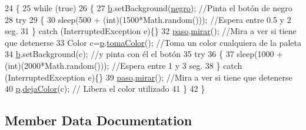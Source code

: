 \begin{DoxyCode}
24     \{
25         \textcolor{keywordflow}{while} (\textcolor{keyword}{true})
26         \{
27             \mbox{\hyperlink{class_r_m_i_1_1_pintor_a00126f610dce8cd5c3fcf4ea2309515a}{b}}.setBackground(\mbox{\hyperlink{class_r_m_i_1_1_pintor_aa79e4aaa47549a4e3903f94e34b9fe6b}{negro}});             \textcolor{comment}{//Pinta el botón de negro}
28             \textcolor{keywordflow}{try}
29             \{
30                 sleep(500 + (\textcolor{keywordtype}{int})(1500*Math.random()));  \textcolor{comment}{//Espera entre 0.5 y 2 seg.}
31             \} \textcolor{keywordflow}{catch} (InterruptedException e)\{\}
32             \mbox{\hyperlink{class_r_m_i_1_1_pintor_a35cc7de76884e55f51a3779eb294e303}{paso}}.\mbox{\hyperlink{class_r_m_i_1_1_paso_a988694346834bbf37f12e3ea425a277c}{mirar}}();              \textcolor{comment}{//Mira a ver si tiene que detenerse}
33             Color c=\mbox{\hyperlink{class_r_m_i_1_1_pintor_a118c7fad449f069021ee68c9630a123c}{p}}.\mbox{\hyperlink{class_r_m_i_1_1_paleta_a3d33527acb560a081844fdbce4e29195}{tomaColor}}();     \textcolor{comment}{//Toma un color cualquiera de la paleta}
34             \mbox{\hyperlink{class_r_m_i_1_1_pintor_a00126f610dce8cd5c3fcf4ea2309515a}{b}}.setBackground(c);        \textcolor{comment}{//y pinta con él el botón}
35             \textcolor{keywordflow}{try}
36             \{
37                 sleep(1000 + (\textcolor{keywordtype}{int})(2000*Math.random()));  \textcolor{comment}{//Espera entre 1 y 3 seg.}
38             \} \textcolor{keywordflow}{catch} (InterruptedException e)\{\}
39             \mbox{\hyperlink{class_r_m_i_1_1_pintor_a35cc7de76884e55f51a3779eb294e303}{paso}}.\mbox{\hyperlink{class_r_m_i_1_1_paso_a988694346834bbf37f12e3ea425a277c}{mirar}}();             \textcolor{comment}{//Mira a ver si tiene que detenerse}
40             \mbox{\hyperlink{class_r_m_i_1_1_pintor_a118c7fad449f069021ee68c9630a123c}{p}}.\mbox{\hyperlink{class_r_m_i_1_1_paleta_aece560f1c69d6f05c612dc7d60a06aaf}{dejaColor}}(c);           \textcolor{comment}{// Libera el color utilizado}
41         \}
42     \}
\end{DoxyCode}


\subsection{Member Data Documentation}
\mbox{\label{class_r_m_i_1_1_pintor_a00126f610dce8cd5c3fcf4ea2309515a}} 
